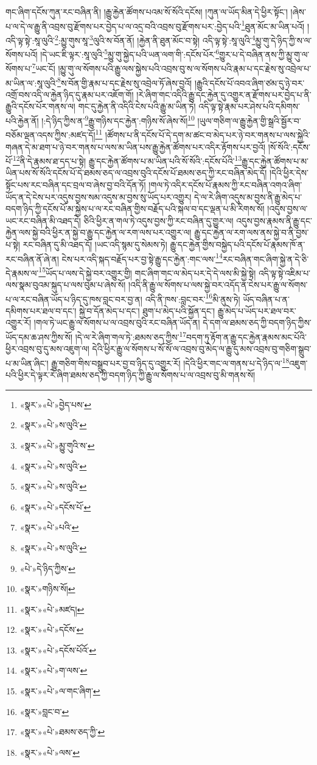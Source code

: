 གང་ཞིག་དངོས་ཀུན་རང་བཞིན་ནི། །རྒྱུ་རྐྱེན་ཚོགས་པའམ་སོ་སོའི་དངོས། །ཀུན་ལ་ཡོད་མིན་དེ་ཕྱིར་སྟོང་། །ཞེས་པ་ལ་དེ་ལ་རྒྱུ་ནི་འབྲས་བུ་རྫོགས་པར་བྱེད་པ་ལ་འདྲ་བའི་འབྲས་བུ་རྫོགས་པར་:བྱེད་པའི་\footnote{«སྣར་»«པེ་»བྱེད་པས་}ཐུན་མོང་མ་ཡིན་པའོ། །འདི་ལྟ་སྟེ་:སཱ་ལུའི་\footnote{«སྣར་»«པེ་»ས་ལུའི་}:མྱུ་གུས་སཱ་\footnote{«སྣར་»«པེ་»མྱུ་གུའི་ས་}ལུའི་ས་བོན་ནོ། །རྐྱེན་ནི་ཐུན་མོང་བ་སྟེ། འདི་ལྟ་སྟེ་:སཱ་ལུའི་\footnote{«སྣར་»«པེ་»ས་ལུའི་}མྱུ་གུ་དེ་ཉིད་ཀྱི་ས་ལ་སོགས་པའོ། །དེ་ཡང་ཇི་ལྟར་:སཱ་ལུའི་\footnote{«སྣར་»«པེ་»ས་ལུའི་}མྱུ་གུ་སྐྱེད་པའི་ཡན་ལག་གི་:དངོས་པོར་\footnote{«སྣར་»«པེ་»དངོས་པོ་}གྱུར་པ་དེ་བཞིན་ནས་ཀྱི་མྱུ་གུ་ལ་སོགས་པ་\footnote{«སྣར་»«པེ་»པའི་}ཡང་ངོ། །མྱུ་གུ་ལ་སོགས་པའི་རྒྱུ་ལས་སྐྱེས་པའི་འབྲས་བུ་ས་ལ་སོགས་པའི་རྣམ་པ་དང་རྗེས་སུ་འབྲེལ་པ་མ་ཡིན་ལ་:སཱ་ལུའི་\footnote{«སྣར་»«པེ་»ས་ལུའི་}ས་བོན་གྱི་རྣམ་པ་དང་རྗེས་སུ་འབྲེལ་ཏོ་ཞེས་བྱའོ། །རྒྱུའི་དངོས་པོ་འབའ་ཞིག་ཙམ་དུ་ཉེ་བར་འགྲོ་བས་འདི་ལ་རྐྱེན་ཉིད་དུ་རྣམ་པར་འཇོག་གོ། །རེ་ཞིག་གང་འདིའི་རྒྱུ་དང་རྐྱེན་དུ་འགྱུར་ན་རྫོགས་པར་བྱེད་པ་ནི་རྒྱུའི་དངོས་པོར་གནས་ལ། གང་དུ་རྐྱེན་ནི་འདིའི་ངེས་པའི་རྒྱུ་མ་ཡིན་ཏེ། འདི་ལྟ་སྟེ་རྣམ་པར་ཤེས་པའི་དམིགས་པའི་རྐྱེན་ནོ། །:དེ་ཉིད་ཀྱིས་ན་\footnote{«པེ་»དེ་ཉིད་ཀྱིས་}རྒྱུ་གཉིས་དང་རྐྱེན་:གཉིས་སོ་ཞེས་སོ།\footnote{«སྣར་»གཉིས་སོ།} །ཡུལ་གཅིག་ལ་རྒྱུ་རྐྱེན་གྱི་སྒྲའི་སྦྱོར་བ་བཅོམ་ལྡན་འདས་ཀྱིས་:མཛད་དོ།\footnote{«སྣར་»«པེ་»མཛད།} །ཚོགས་པ་ནི་དངོས་པོ་དེ་དག་མ་ཚང་བ་མེད་པར་ཉེ་བར་གནས་པ་ལས་སྐྱེའི་གཞན་དེ་མ་ཐག་པ་ཉེ་བར་གནས་པ་ལས་མ་ཡིན་པས་རྒྱུ་རྐྱེན་ཚོགས་པར་འདིར་རྟོགས་པར་བྱའོ། །སོ་སོའི་:དངོས་པོ་\footnote{«སྣར་»«པེ་»དངོས་}ནི་དེ་རྣམས་ཐ་དད་པ་སྟེ། རྒྱུ་དང་རྐྱེན་ཚོགས་པ་མ་ཡིན་པའི་སོ་སོའི་:དངོས་པོའི་\footnote{«སྣར་»«པེ་»དངོས་པོའོ་}རྒྱུ་དང་རྐྱེན་ཚོགས་པ་མ་ཡིན་པས་སོ་སོའི་དངོས་པོ་དེ་ཐམས་ཅད་ལ་འབྲས་བུའི་དངོས་པོ་ཐམས་ཅད་ཀྱི་རང་བཞིན་མེད་དོ། །དེའི་ཕྱིར་དེས་སྟོང་པས་རང་བཞིན་དང་བྲལ་བ་ཞེས་བྱ་བའི་དོན་ཏོ། །གལ་ཏེ་འདིར་དངོས་པོ་རྣམས་ཀྱི་རང་བཞིན་འགའ་ཞིག་ཡོད་ན་དེ་ངེས་པར་འདུས་བྱས་སམ་འདུས་མ་བྱས་སུ་ཡོད་པར་འགྱུར། དེ་ལ་རེ་ཞིག་འདུས་མ་བྱས་ནི་རྒྱུ་མེད་པ་བདག་ཉིད་ཀྱི་དངོས་པོ་མ་སྐྱེས་པ་ལ་རང་བཞིན་གྱིས་བརྗོད་པའི་སྐལ་བ་དང་ལྡན་པ་མི་རིགས་སོ། །འདུས་བྱས་ལ་ཡང་རང་བཞིན་མི་འཐད་དེ། ཅིའི་ཕྱིར་ན་གལ་ཏེ་འདུས་བྱས་ཀྱི་རང་བཞིན་དུ་གྱུར་ལ། འདུས་བྱས་རྣམས་ནི་རྒྱུ་དང་རྐྱེན་ལས་སྐྱེ་བའི་ཕྱིར་ན་སྐྱེ་བ་རྒྱུ་དང་རྐྱེན་ལ་རག་ལས་པར་འགྱུར་ལ། རྒྱུ་དང་རྐྱེན་ལ་རག་ལས་ནས་སྐྱེ་བ་ནི་བྱས་པ་སྟེ། རང་བཞིན་དུ་མི་འཐད་དོ། །ཡང་འདི་སྙམ་དུ་སེམས་ཏེ། རྒྱུ་དང་རྐྱེན་གྱིས་བསྐྱེད་པའི་དངོས་པོ་རྣམས་ཁོ་ན་རང་བཞིན་ནོ་ཞེ་ན། ངེས་པར་འདི་སྐད་བརྗོད་པར་བྱ་སྟེ་རྒྱུ་དང་རྐྱེན་:གང་ལས་\footnote{«སྣར་»«པེ་»ག་ལས་}རང་བཞིན་གང་ཞིག་སྐྱེ་ན་དེ་ཅི་དེ་རྣམས་ལ་\footnote{«སྣར་»«པེ་»ལ་གང་ཞིག་}ཡོད་པ་ལས་དེ་སྐྱེ་བར་འགྱུར་གྱི། གང་ཞིག་གང་ལ་མེད་པར་དེ་དེ་ལས་མི་སྐྱེ་སྟེ། འདི་ལྟ་སྟེ་འཇིམ་པ་ལས་སྣམ་བུའམ་སྐུད་པ་ལས་བུམ་པ་ཞེས་སོ། །འདི་ནི་རྒྱུ་ལ་སོགས་པ་ལས་སྐྱེ་བར་འདོད་ན་ངེས་པར་རྒྱུ་ལ་སོགས་པ་ལ་རང་བཞིན་ཡོད་པ་ཉིད་དུ་ཁས་བླང་བར་བྱ་ན། འདི་ནི་ཁས་:བླང་བར་\footnote{«སྣར་»བླང་བ་}མི་ནུས་ཏེ། ཡོད་བཞིན་པ་ན་དམིགས་པར་ཐལ་བ་དང་། སྐྱེ་བ་དོན་མེད་པ་དང་། ཐུག་པ་མེད་པའི་སྐྱོན་དང་། རྒྱུ་མེད་པ་ཡོད་པར་ཐལ་བར་འགྱུར་རོ། །གལ་ཏེ་ཡང་རྒྱུ་ལ་སོགས་པ་ལ་འབྲས་བུའི་རང་བཞིན་ཡོད་ན། དེ་དག་ལ་ཐམས་ཅད་ཀྱི་བདག་ཉིད་ཀྱིས་ཡོད་དམ་ཆ་ཤས་ཀྱིས་སོ། །དེ་ལ་རེ་ཞིག་གལ་ཏེ་:ཐམས་ཅད་ཀྱིས་\footnote{«སྣར་»«པེ་»ཐམས་ཅད་ཀྱི་}བདག་ཏུ་རྟོག་ན་རྒྱུ་དང་རྐྱེན་རྣམས་མང་པོའི་ཕྱིར་འབྲས་བུ་དུ་མས་འཇུག་ལ། དེའི་ཕྱིར་རྒྱུ་ལ་སོགས་པ་སོ་སོ་ལ་འབྲས་བུ་མེད་ལ་རྒྱུ་དུ་མས་འབྲས་བུ་གཅིག་སྒྲུབ་པ་མ་ཡིན་ཞིང་། རྒྱུ་གཅིག་གིས་བསྒྲུབ་པར་བྱ་བ་ཉིད་དུ་འགྱུར་རོ། །དེའི་ཕྱིར་གང་ལ་གནས་པ་དེ་ཉིད་ལ་\footnote{«སྣར་»«པེ་»ལས་}འཇུག་པའི་ཕྱིར་དེ་ལྟར་རེ་ཞིག་ཐམས་ཅད་ཀྱི་བདག་ཉིད་ཀྱི་རྒྱུ་ལ་སོགས་པ་ལ་འབྲས་བུ་མི་གནས་སོ། 